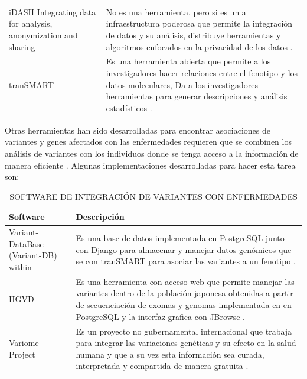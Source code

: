 \begin{table}[]
\begin{tabular}{|p{5cm}|p{10cm}|}
		iDASH Integrating data for analysis, anonymization and sharing & No es una herramienta, pero si es un a infraestructura poderosa que permite la integración de datos y su análisis, distribuye herramientas y algoritmos enfocados en la privacidad de los datos \cite{Canuel2015}. \\ \cline{1-2}
		
		tranSMART & Es una herramienta abierta que permite a los investigadores hacer relaciones entre el fenotipo y los datos moleculares, Da a los investigadores herramientas para generar descripciones y análisis estadísticos \cite{Canuel2015}. \\ \hline		
		
	\end{tabular}
\end{table}

Otras herramientas han sido desarrolladas para encontrar asociaciones de variantes y genes afectados con las enfermedades requieren que se combinen los análisis de variantes con los individuos donde se tenga acceso a la información de manera eficiente \cite{Kutzera2017}. Algunas implementaciones desarrolladas para hacer esta tarea son:

\begin{table}[H]
	\centering
	\caption{SOFTWARE DE INTEGRACIÓN DE VARIANTES CON ENFERMEDADES}
	\label{r}
	\begin{tabular}{|p{5cm}|p{10cm}|}
		\hline
		Software     & Descripción                                                                                                                                                                                                                                                                                                                                                                     \\ \hline
		Variant-DataBase (Variant-DB) within      & Es una base de datos implementada en PostgreSQL junto con Django para almacenar y manejar datos genómicos que se con tranSMART para asociar las variantes a un fenotipo \cite{Kutzera2017}.      \\ \cline{1-2}
		HGVD       & Es una herramienta con acceso web que permite manejar las variantes dentro de la población japonesa obtenidas a partir de secuenciación de exomas y genomas implementada en en PostgreSQL y la interfaz grafica con JBrowse \cite{Higasa2016}.       \\ \cline{1-2}
		Variome Project    &   Es un proyecto no gubernamental internacional que trabaja para integrar las variaciones genéticas y su efecto en la salud humana y que a su vez esta información sea curada, interpretada y compartida de manera gratuita \cite{variome2017}.                                                                                                                                                                                                              \\ \hline
	\end{tabular}
\end{table}


